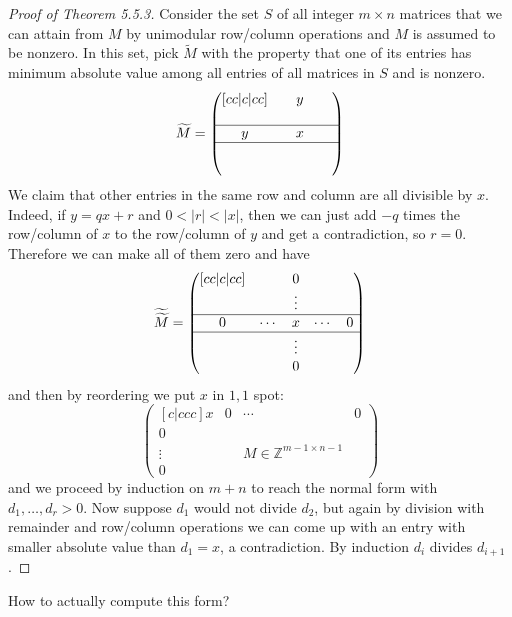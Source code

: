 \documentclass[a4paper]{article}
\theoremstyle{definition}
\begin{document}
\begin{proof}[Proof of Theorem 5.5.3]
Consider the set $S$ of all integer $m\times n$ matrices that we can attain from $M$ by unimodular row/column operations and $M$ is assumed to be nonzero. In this set, pick $\widetilde{M}$ with the property that one of its entries has minimum absolute value among all entries of all matrices in $S$ and is nonzero.
\[
\widetilde{M}=\begin{pmatrix}[cc|c|cc]
&&y&& \\&&&& \\ \hline
y & & x & & \\ \hline
 &&&& \\ &&&&
\end{pmatrix}
\]
We claim that other entries in the same row and column are all divisible by $x$. Indeed, if $y=qx+r$ and $0<|r|<|x|$, then we can just add $-q$ times the row/column of $x$ to the row/column of $y$ and get a contradiction, so $r=0$. Therefore we can make all of them zero and have
\[
\widetilde{\widetilde{M}} = \begin{pmatrix}[cc|c|cc]
&&0&& \\&&\vdots&& \\ \hline
0 & \cdots & x &\cdots & 0 \\ \hline
 &&\vdots&& \\ &&0&&
\end{pmatrix}
\]
and then by reordering we put $x$ in $1,1$ spot:
\[
\begin{pmatrix}[c|ccc]
x & 0 & \cdots & 0 \\ \hline
0 \\
\vdots & & M\in \mathbb Z^{m-1\times n-1} \\
0
\end{pmatrix}
\]
and we proceed by induction on $m+n$ to reach the normal form with $d_1,\ldots,d_r>0$. Now suppose $d_1$ would not divide $d_2$, but again by division with remainder and row/column operations we can come up with an entry with smaller absolute value than $d_1=x$, a contradiction. By induction $d_i$ divides $d_{i+1}$.
\end{proof}
How to actually compute this form?
\end{document}
